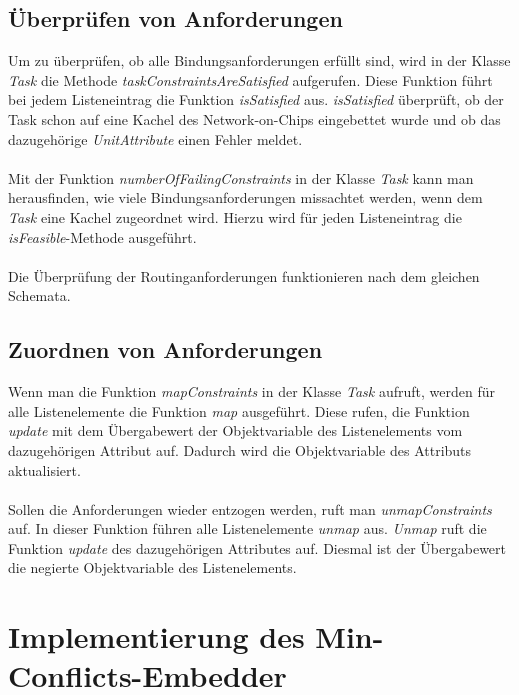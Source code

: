 \subsection{Überprüfen von Anforderungen}
Um zu überprüfen, ob alle Bindungsanforderungen erfüllt sind, wird in der Klasse \textit{Task} die Methode \textit{taskConstraintsAreSatisfied} aufgerufen. Diese Funktion führt bei jedem Listeneintrag die Funktion \textit{isSatisfied} aus. \textit{isSatisfied} überprüft, ob der Task schon auf eine Kachel des Network-on-Chips eingebettet wurde und ob das dazugehörige \textit{UnitAttribute} einen Fehler meldet.\\
\\
Mit der Funktion \textit{numberOfFailingConstraints} in der Klasse \textit{Task} kann man herausfinden, wie viele Bindungsanforderungen missachtet werden, wenn dem \textit{Task} eine Kachel zugeordnet wird. Hierzu wird für jeden Listeneintrag die \textit{isFeasible}-Methode ausgeführt.\\
\\
Die Überprüfung der Routinganforderungen funktionieren nach dem gleichen Schemata.

\subsection{Zuordnen  von Anforderungen}
Wenn man die Funktion \textit{mapConstraints} in der Klasse \textit{Task} aufruft, werden für alle Listenelemente die Funktion \textit{map} ausgeführt. Diese rufen, die Funktion \textit{update} mit dem Übergabewert der Objektvariable des Listenelements vom dazugehörigen Attribut auf. Dadurch wird die Objektvariable des Attributs aktualisiert.\\
\\
Sollen die Anforderungen wieder entzogen werden, ruft man \textit{unmapConstraints} auf. In dieser Funktion führen alle Listenelemente \textit{unmap} aus. \textit{Unmap} ruft die Funktion \textit{update} des dazugehörigen Attributes auf. Diesmal ist der Übergabewert die negierte Objektvariable des Listenelements.



\section{Implementierung des Min-Conflicts-Embedder}\label{minConflictImpl}

